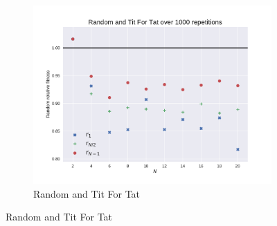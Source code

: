 \documentclass{article}
\begin{document}
\begin{figure}[!hbtp]
\begin{subfigure}[t]{.3\textwidth}
        \includegraphics[width=.8\textwidth]{./img/Random_v_Tit_For_Tat_fitness.pdf}
        \caption{Random and Tit For Tat}
    \end{subfigure}%


\end{figure}
\end{document}
